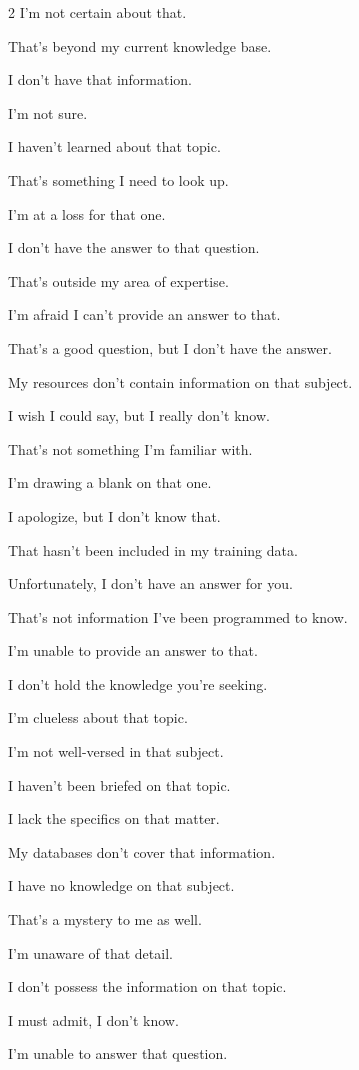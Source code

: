 \begin{multicols}{2}
I'm not certain about that.

That's beyond my current knowledge base.

I don't have that information.

I'm not sure.

I haven't learned about that topic.

That's something I need to look up.

I'm at a loss for that one.

I don't have the answer to that question.

That's outside my area of expertise.

I'm afraid I can't provide an answer to that.

That's a good question, but I don't have the answer.

My resources don't contain information on that subject.

I wish I could say, but I really don't know.

That's not something I'm familiar with.

I'm drawing a blank on that one.

I apologize, but I don't know that.

That hasn't been included in my training data.

Unfortunately, I don't have an answer for you.

That's not information I've been programmed to know.

I'm unable to provide an answer to that.

I don't hold the knowledge you're seeking.

I'm clueless about that topic.

I'm not well-versed in that subject.

I haven't been briefed on that topic.

I lack the specifics on that matter.

My databases don't cover that information.

I have no knowledge on that subject.

That's a mystery to me as well.

I'm unaware of that detail.

I don't possess the information on that topic.

I must admit, I don't know.

I'm unable to answer that question.


\end{multicols}

